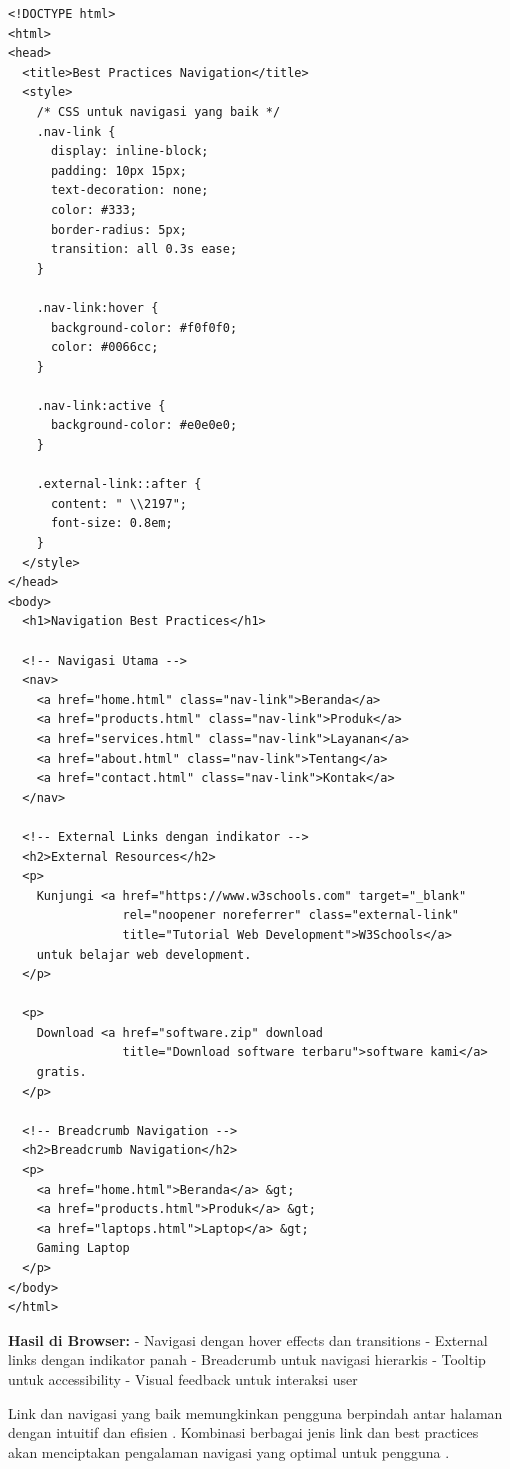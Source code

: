 \begin{lstlisting}[caption={Best Practices Example}, basicstyle=\ttfamily\small, frame=single]
<!DOCTYPE html>
<html>
<head>
  <title>Best Practices Navigation</title>
  <style>
    /* CSS untuk navigasi yang baik */
    .nav-link {
      display: inline-block;
      padding: 10px 15px;
      text-decoration: none;
      color: #333;
      border-radius: 5px;
      transition: all 0.3s ease;
    }
    
    .nav-link:hover {
      background-color: #f0f0f0;
      color: #0066cc;
    }
    
    .nav-link:active {
      background-color: #e0e0e0;
    }
    
    .external-link::after {
      content: " \\2197";
      font-size: 0.8em;
    }
  </style>
</head>
<body>
  <h1>Navigation Best Practices</h1>
  
  <!-- Navigasi Utama -->
  <nav>
    <a href="home.html" class="nav-link">Beranda</a>
    <a href="products.html" class="nav-link">Produk</a>
    <a href="services.html" class="nav-link">Layanan</a>
    <a href="about.html" class="nav-link">Tentang</a>
    <a href="contact.html" class="nav-link">Kontak</a>
  </nav>
  
  <!-- External Links dengan indikator -->
  <h2>External Resources</h2>
  <p>
    Kunjungi <a href="https://www.w3schools.com" target="_blank" 
                rel="noopener noreferrer" class="external-link" 
                title="Tutorial Web Development">W3Schools</a> 
    untuk belajar web development.
  </p>
  
  <p>
    Download <a href="software.zip" download 
                title="Download software terbaru">software kami</a> 
    gratis.
  </p>
  
  <!-- Breadcrumb Navigation -->
  <h2>Breadcrumb Navigation</h2>
  <p>
    <a href="home.html">Beranda</a> &gt; 
    <a href="products.html">Produk</a> &gt; 
    <a href="laptops.html">Laptop</a> &gt; 
    Gaming Laptop
  </p>
</body>
</html>
\end{lstlisting}

\textbf{Hasil di Browser:}
- Navigasi dengan hover effects dan transitions
- External links dengan indikator panah
- Breadcrumb untuk navigasi hierarkis
- Tooltip untuk accessibility
- Visual feedback untuk interaksi user

Link dan navigasi yang baik memungkinkan pengguna berpindah antar halaman dengan intuitif dan efisien \cite{w3schools-html}. Kombinasi berbagai jenis link dan best practices akan menciptakan pengalaman navigasi yang optimal untuk pengguna \cite{mdn-html}.
